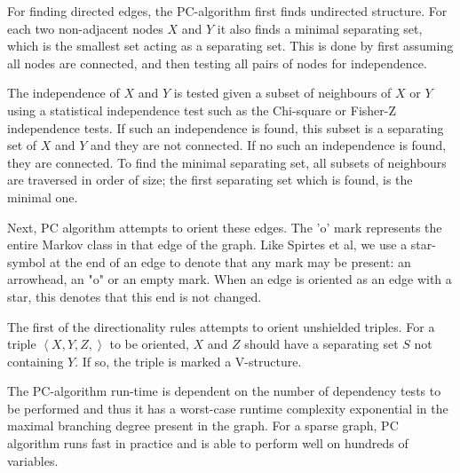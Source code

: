 \documentclass[a4paper, 10pt, english, onecolumn]{article}
\def \srightarrow {\text{\textasteriskcentered}\hspace{-0.62em}\rightarrow}
\def \sleftarrow {\leftarrow\hspace{-0.62em}\text{\textasteriskcentered}}
\def \sleftline {-\hspace{-0.40em}\text{\textasteriskcentered}}
\def \sline {\text{\textasteriskcentered}\hspace{-0.38em}-\hspace{-0.4em}\text{\textasteriskcentered}}
\begin{document}
For finding directed edges, the PC-algorithm first finds undirected structure.
For each two non-adjacent nodes $X$ and $Y$ it also finds a minimal separating set, which is the smallest set acting as a separating set.
This is done by first assuming all nodes are connected, and then testing all pairs of nodes for independence.

The independence of $X$ and $Y$ is tested given a subset of neighbours of $X$ or $Y$ using a statistical independence test such as the Chi-square or Fisher-Z independence tests.
If such an independence is found, this subset is a separating set of $X$ and $Y$ and they are not connected.
If no such an independence is found, they are connected.
To find the minimal separating set, all subsets of neighbours are traversed in order of size; the first separating set which is found, is the minimal one.

Next, PC algorithm attempts to orient these edges.
The 'o' mark represents the entire Markov class in that edge of the graph.
Like Spirtes et al, we use a star-symbol at the end of an edge to denote that any mark may be present: an arrowhead, an "o" or an empty mark.
When an edge is oriented as an edge with a star, this denotes that this end is not changed.

The first of the directionality rules attempts to orient unshielded triples.
For a triple $\left < X,Y,Z, \right>$ to be oriented, $X$ and $Z$ should have a separating set $S$ not containing $Y$.
If so, the triple is marked a V-structure.


The PC-algorithm run-time is dependent on the number of dependency tests to be performed and thus it has a worst-case runtime complexity exponential in the maximal branching degree present in the graph.
For a sparse graph, PC algorithm runs fast in practice and is able to perform well on hundreds of variables.
\end{document}
